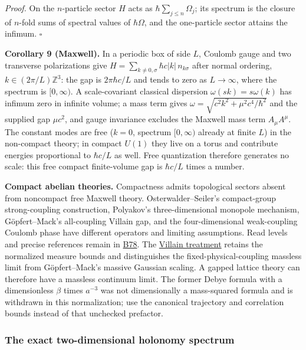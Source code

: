 \documentclass[11pt,a4paper]{article}
\begin{document}
\emph{Proof.} On the \(n\)-particle sector \(H\) acts as
\(\hbar\sum_{j\le n}\Omega_j\); its spectrum is the closure of
\(n\)-fold sums of spectral values of \(\hbar\Omega\), and the
one-particle sector attains the infimum. \(\square\)

\textbf{Corollary 9 (Maxwell).} In a periodic box of side \(L\), Coulomb
gauge and two transverse polarizations give
\(H=\sum_{k\ne0,\sigma}\hbar c|k|\, n_{k\sigma}\) after normal ordering,
\(k\in(2\pi/L)\mathbb Z^3\): the gap is \(2\pi\hbar c/L\) and tends to
zero as \(L\to\infty\), where the spectrum is \([0,\infty)\). A
scale-covariant classical dispersion \(\omega(sk)=s\omega(k)\) has
infimum zero in infinite volume; a mass term gives
\(\omega=\sqrt{c^2k^2+\mu^2c^4/\hbar^2}\) and the supplied gap
\(\mu c^2\), and gauge invariance excludes the Maxwell mass term
\(A_\mu A^\mu\). The constant modes are free (\(k=0\), spectrum
\([0,\infty)\) already at finite \(L\)) in the non-compact theory; in
compact \(U(1)\) they live on a torus and contribute energies
proportional to \(\hbar c/L\) as well. Free quantization therefore
generates no scale: this free compact finite-volume gap is \(\hbar c/L\)
times a number.

\textbf{Compact abelian theories.} Compactness admits topological
sectors absent from noncompact free Maxwell theory.
Osterwalder--Seiler's compact-group strong-coupling construction,
Polyakov's three-dimensional monopole mechanism, Göpfert--Mack's
all-coupling Villain gap, and the four-dimensional weak-coupling Coulomb
phase have different operators and limiting assumptions. Read levels and
precise references remain in \href{../references/batches/B78.md}{B78}.
The \href{villain-monopole-refinement.md}{Villain treatment} retains the
normalized measure bounds and distinguishes the fixed-physical-coupling
massless limit from Göpfert--Mack's massive Gaussian scaling. A gapped
lattice theory can therefore have a massless continuum limit. The former
Debye formula with a dimensionless \(\beta\) times \(a^{-3}\) was not
dimensionally a mass-squared formula and is withdrawn in this
normalization; use the canonical trajectory and correlation bounds
instead of that unchecked prefactor.

\hypertarget{the-exact-two-dimensional-holonomy-spectrum}{%
\subsubsection{The exact two-dimensional holonomy
spectrum}\label{the-exact-two-dimensional-holonomy-spectrum}}
\end{document}
